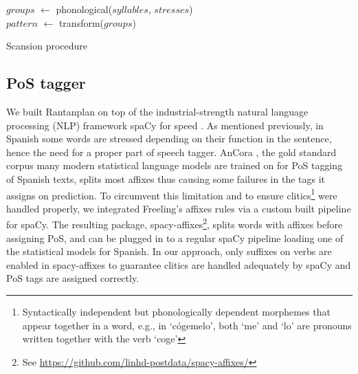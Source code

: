\documentclass[a4paper,11pt,twocolumn,twoside]{article}
\begin{document}
\begin{algorithm} \label{alg:algo.1}
\SetAlgoLined
{}
 $groups$ $\gets$ phonological($syllables$, $stresses$) \\
 $pattern$ $\gets$ transform($groups$)\\
 \caption{Scansion procedure}
\end{algorithm}

\subsection{PoS tagger}
We built Rantanplan on top of the industrial-strength natural language processing (NLP) framework spaCy for speed \cite{honnibal2017spacy}. As mentioned previously, in Spanish some words are stressed depending on their function in the sentence, hence the need for a proper part of speech tagger. AnCora \cite{taule2008ancora}, the gold standard corpus many modern statistical language models are trained on for PoS tagging of Spanish texts, splits most affixes thus causing some failures in the tags it assigns on prediction. To circumvent this limitation and to ensure clitics\footnote{Syntactically independent but phonologically dependent morphemes that appear together in a word, e.g., in `cógemelo', both `me' and `lo' are pronouns written together with the verb `coge'} were handled properly, we integrated Freeling's affixes rules via a custom built pipeline for spaCy. The resulting package, spacy-affixes\footnote{See \url{https://github.com/linhd-postdata/spacy-affixes/}}, splits words with affixes before assigning PoS, and can be plugged in to a regular spaCy pipeline loading one of the statistical models for Spanish. In our approach, only suffixes on verbs are enabled in spacy-affixes to guarantee clitics are handled adequately by spaCy and PoS tags are assigned correctly.
\end{document}
